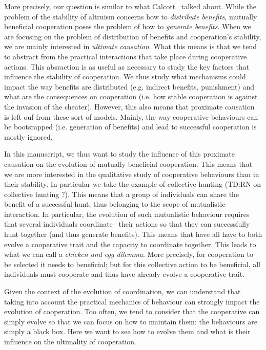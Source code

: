     More precisely, our question is similar to what Calcott~\cite{Calcott2008} talked about. While the problem of the stability of altruism concerns how to \emph{distribute benefits}, mutually beneficial cooperation poses the problem of how to \emph{generate benefits}. When we are focusing on the problem of distribution of benefits and cooperation's stability, we are mainly interested in \emph{ultimate causation}. What this means is that we tend to abstract from the practical interactions that take place during cooperative actions. This absraction is as useful as necessary to study the key factors that influence the stability of cooperation. We thus study what mechanisms could impact the way benefits are distributed (e.g. indirect benefits, punishment) and what are the consequences on cooperation (i.e. how stable cooperation is against the invasion of the cheater). However, this also means that proximate causation~\cite{Tinbergen1963, West2007} is left ouf from these sort of models. Mainly, the way cooperative behaviours can be bootsrapped (i.e. generation of benefits) and lead to successful cooperation is mostly ignored.

    In this manuscript, we thus want to study the influence of this proximate causation on the evolution of mutually beneficial cooperation. This means that we are more interested in the qualitative study of cooperative behaviours than in their stability. In particular we take the example of collective hunting (TD:RN on collective hunting ?). This means that a group of individuals can share the benefit of a successful hunt, thus belonging to the scope of mutualistic interaction. In particular, the evolution of such mutualistic behaviour requires that several individuals coordinate~\cite{Alvard2001, Alvard2003, Drea2009, Leimar2003} their actions so that they can successfully hunt together (and thus generate benefits). This means that have all have to both evolve a cooperative trait and the capacity to coordinate together. This leads to what we can call a \emph{chicken and egg dilemma}. More precisely, for cooperation to be selected it needs to beneficial; but for this collective action to be beneficial, all individuals must cooperate and thus have already evolve a cooperative trait.

    Given the context of the evolution of coordination, we can understand that taking into account the practical mechanics of behaviour can strongly impact the evolution of cooperation. Too often, we tend to consider that the cooperative can simply evolve so that we can focus on how to maintain them: the behaviours are simply a black box. Here we want to see how to evolve them and what is their influence on the ultimality of cooperation.

